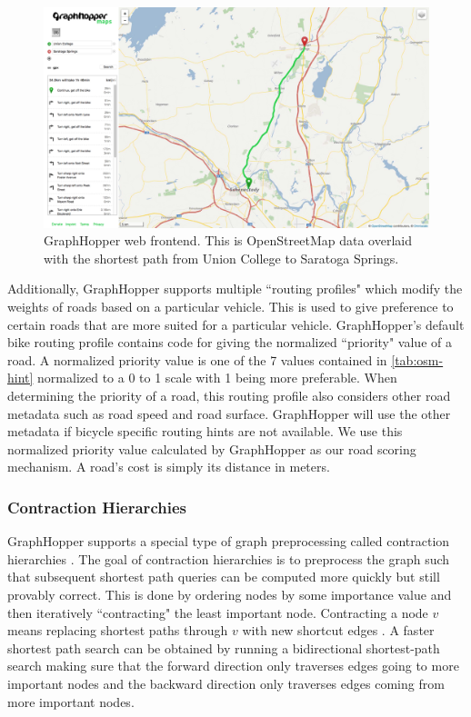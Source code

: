 \documentclass[honors]{union-cs-thesis}
\begin{document}
\begin{figure}
    \begin{center}
        \includegraphics[width=\textwidth]{figs/graphhopper}
    \end{center}
    \caption[GraphHopper web frontend]{GraphHopper web frontend. This is OpenStreetMap data overlaid with the shortest path from Union College to Saratoga Springs.}
    \label{tab:graphhopper-frontend}
\end{figure}

Additionally, GraphHopper supports multiple ``routing profiles" which modify the weights of roads based on a particular vehicle. This is used to give preference to certain roads that are more suited for a particular vehicle. GraphHopper's default bike routing profile contains code for giving the normalized ``priority" value of a road. A normalized priority value is one of the 7 values contained in \cref{tab:osm-hint} normalized to a 0 to 1 scale with 1 being more preferable. When determining the priority of a road, this routing profile also considers other road metadata such as road speed and road surface. GraphHopper will use the other metadata if bicycle specific routing hints are not available. We use this normalized priority value calculated by GraphHopper as our road scoring mechanism. A road's cost is simply its distance in meters.


\subsubsection{Contraction Hierarchies}
GraphHopper supports a special type of graph preprocessing called contraction hierarchies \cite{graphhopper}. The goal of contraction hierarchies is to preprocess the graph such that subsequent shortest path queries can be computed more quickly but still provably correct. This is done by ordering nodes by some importance value and then iteratively ``contracting" the least important node. Contracting a node $v$ means replacing shortest paths through $v$ with new shortcut edges \cite{geisberger2008contraction}. A faster shortest path search can be obtained by running a bidirectional shortest-path search making sure that the forward direction only traverses edges going to more important nodes and the backward direction only traverses edges coming from more important nodes.
\end{document}
